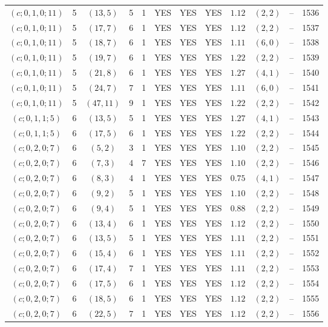 \begin{longtable}{|c|c|c|c|c|c|c|c|c|c|c|c|}
$(c;0,1,0;11)$ & 5 & $(13,5)$ & 5 & 1 & YES & YES & YES & $1.12$ & $(2,2)$ & -- & 1536\\
$(c;0,1,0;11)$ & 5 & $(17,7)$ & 6 & 1 & YES & YES & YES & $1.12$ & $(2,2)$ & -- & 1537\\
$(c;0,1,0;11)$ & 5 & $(18,7)$ & 6 & 1 & YES & YES & YES & $1.11$ & $(6,0)$ & -- & 1538\\
$(c;0,1,0;11)$ & 5 & $(19,7)$ & 6 & 1 & YES & YES & YES & $1.22$ & $(2,2)$ & -- & 1539\\
$(c;0,1,0;11)$ & 5 & $(21,8)$ & 6 & 1 & YES & YES & YES & $1.27$ & $(4,1)$ & -- & 1540\\
$(c;0,1,0;11)$ & 5 & $(24,7)$ & 7 & 1 & YES & YES & YES & $1.11$ & $(6,0)$ & -- & 1541\\
$(c;0,1,0;11)$ & 5 & $(47,11)$ & 9 & 1 & YES & YES & YES & $1.22$ & $(2,2)$ & -- & 1542\\
$(c;0,1,1;5)$ & 6 & $(13,5)$ & 5 & 1 & YES & YES & YES & $1.27$ & $(4,1)$ & -- & 1543\\
$(c;0,1,1;5)$ & 6 & $(17,5)$ & 6 & 1 & YES & YES & YES & $1.22$ & $(2,2)$ & -- & 1544\\
$(c;0,2,0;7)$ & 6 & $(5,2)$ & 3 & 1 & YES & YES & YES & $1.10$ & $(2,2)$ & -- & 1545\\
$(c;0,2,0;7)$ & 6 & $(7,3)$ & 4 & 7 & YES & YES & YES & $1.10$ & $(2,2)$ & -- & 1546\\
$(c;0,2,0;7)$ & 6 & $(8,3)$ & 4 & 1 & YES & YES & YES & $0.75$ & $(4,1)$ & -- & 1547\\
$(c;0,2,0;7)$ & 6 & $(9,2)$ & 5 & 1 & YES & YES & YES & $1.10$ & $(2,2)$ & -- & 1548\\
$(c;0,2,0;7)$ & 6 & $(9,4)$ & 5 & 1 & YES & YES & YES & $0.88$ & $(2,2)$ & -- & 1549\\
$(c;0,2,0;7)$ & 6 & $(13,4)$ & 6 & 1 & YES & YES & YES & $1.12$ & $(2,2)$ & -- & 1550\\
$(c;0,2,0;7)$ & 6 & $(13,5)$ & 5 & 1 & YES & YES & YES & $1.11$ & $(2,2)$ & -- & 1551\\
$(c;0,2,0;7)$ & 6 & $(15,4)$ & 6 & 1 & YES & YES & YES & $1.11$ & $(2,2)$ & -- & 1552\\
$(c;0,2,0;7)$ & 6 & $(17,4)$ & 7 & 1 & YES & YES & YES & $1.11$ & $(2,2)$ & -- & 1553\\
$(c;0,2,0;7)$ & 6 & $(17,5)$ & 6 & 1 & YES & YES & YES & $1.12$ & $(2,2)$ & -- & 1554\\
$(c;0,2,0;7)$ & 6 & $(18,5)$ & 6 & 1 & YES & YES & YES & $1.12$ & $(2,2)$ & -- & 1555\\
$(c;0,2,0;7)$ & 6 & $(22,5)$ & 7 & 1 & YES & YES & YES & $1.12$ & $(2,2)$ & -- & 1556\\

\end{longtable}
